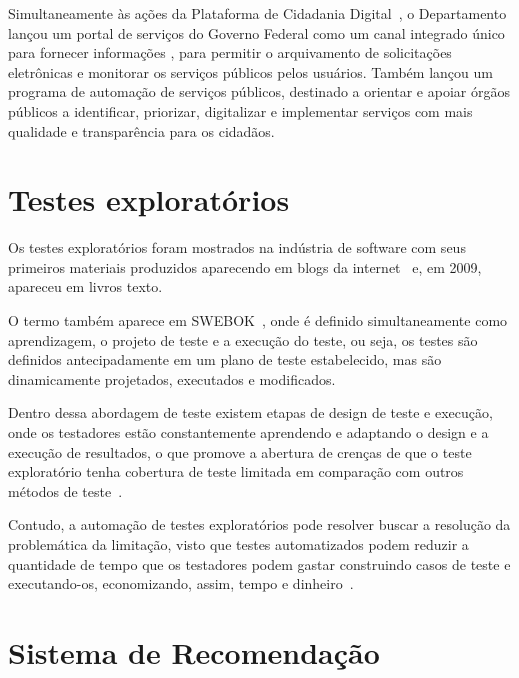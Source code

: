 Simultaneamente às ações da Plataforma de Cidadania Digital~\cite{decreto-8936}, o Departamento lançou um portal de serviços 
do Governo Federal como um canal integrado único para fornecer informações , para permitir o arquivamento de solicitações eletrônicas e monitorar os serviços públicos pelos usuários. Também lançou um programa de automação de serviços 
públicos, destinado a orientar e apoiar órgãos públicos a identificar, priorizar, digitalizar e implementar serviços com mais 
qualidade e transparência para os cidadãos.


\section{Testes exploratórios}

Os testes exploratórios foram mostrados na indústria de software com seus primeiros materiais produzidos 
aparecendo em blogs da internet~\cite{kaner2000testing} e, em 2009, apareceu em livros texto. 

O termo também aparece em SWEBOK~\cite{bourque2014guide}, onde é definido simultaneamente como aprendizagem, o projeto de teste 
e a execução do teste, ou seja, os testes são definidos antecipadamente em um plano de teste estabelecido, mas 
são dinamicamente projetados, executados e modificados.

Dentro dessa abordagem de teste existem etapas de design de teste e execução, onde os testadores estão constantemente aprendendo e 
adaptando o design e a execução de resultados, o que promove a abertura de crenças de que o teste exploratório tenha cobertura de 
teste limitada em comparação com outros métodos de teste~\cite{schaefer2014model}.

Contudo, a automação de testes exploratórios pode resolver buscar a resolução da problemática da limitação, visto que testes 
automatizados podem reduzir a quantidade de tempo que os testadores podem gastar construindo casos de teste e executando-os, 
economizando, assim, tempo e dinheiro~\cite{dustin2009implementing}. 


\section{Sistema de Recomendação}
